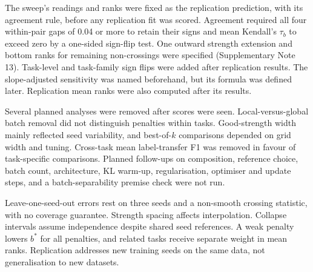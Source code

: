 The sweep's readings and ranks were fixed as the replication prediction, with its agreement rule, before any replication fit was scored. Agreement required all four within-pair gaps of 0.04 or more to retain their signs and mean Kendall's $\tau_b$ to exceed zero by a one-sided sign-flip test. One outward strength extension and bottom ranks for remaining non-crossings were specified (Supplementary Note 13). Task-level and task-family sign flips were added after replication results. The slope-adjusted sensitivity was named beforehand, but its formula was defined later. Replication mean ranks were also computed after its results.

Several planned analyses were removed after scores were seen. Local-versus-global batch removal did not distinguish penalties within tasks. Good-strength width mainly reflected seed variability, and best-of-$k$ comparisons depended on grid width and tuning. Cross-task mean label-transfer F1 was removed in favour of task-specific comparisons. Planned follow-ups on composition, reference choice, batch count, architecture, KL warm-up, regularisation, optimiser and update steps, and a batch-separability premise check were not run.

Leave-one-seed-out errors rest on three seeds and a non-smooth crossing statistic, with no coverage guarantee. Strength spacing affects interpolation. Collapse intervals assume independence despite shared seed references. A weak penalty lowers $b^*$ for all penalties, and related tasks receive separate weight in mean ranks. Replication addresses new training seeds on the same data, not generalisation to new datasets.
\par\endgroup
